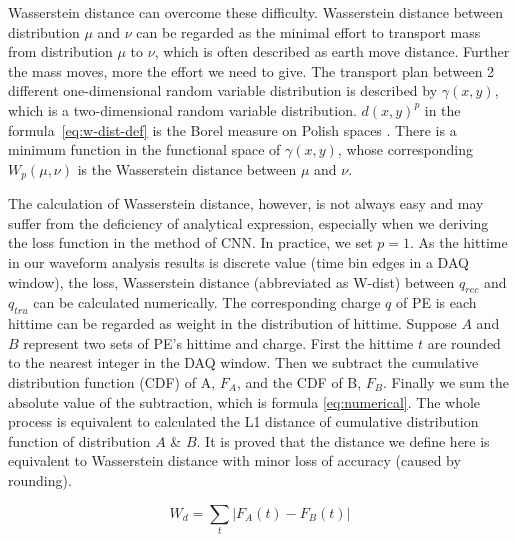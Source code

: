 Wasserstein distance can overcome these difficulty. Wasserstein distance between distribution $\mu$ and $\nu$ can be regarded as the minimal effort to transport mass from distribution $\mu$ to $\nu$, which is often described as earth move distance. Further the mass moves, more the effort we need to give. The transport plan between 2 different one-dimensional random variable distribution is described by $\gamma(x, y)$, which is a two-dimensional random variable distribution. $d(x,y)^{p}$ in the formula~\eqref{eq:w-dist-def} is the Borel measure on Polish spaces \cite{villani_2009}. There is a minimum function in the functional space of $\gamma(x, y)$, whose corresponding $W_{p}(\mu,\nu)$ is the Wasserstein distance between $\mu$ and $\nu$. 

The calculation of Wasserstein distance, however, is not always easy and may suffer from the deficiency of analytical expression, especially when we deriving the loss function in the method of CNN. In practice, we set $p=1$. As the hittime in our waveform analysis results is discrete value (time bin edges in a DAQ window), the loss, Wasserstein distance (abbreviated as W-dist) between $q_{rec}$ and $q_{tru}$ can be calculated numerically. The corresponding charge $q$ of PE is each hittime can be regarded as weight in the distribution of hittime. Suppose $A$ and $B$ represent two sets of PE's hittime and charge. First the hittime $t$ are rounded to the nearest integer in the DAQ window. Then we subtract the cumulative distribution function (CDF) of A, $F_{A}$, and the CDF of B, $F_{B}$. Finally we sum the absolute value of the subtraction, which is formula \eqref{eq:numerical}. The whole process is equivalent to calculated the L1 distance of cumulative distribution function of distribution $A$ \& $B$. It is proved that the distance we define here is equivalent to Wasserstein distance with minor loss of accuracy (caused by rounding). 

\begin{equation}
    W_{d} = \sum_t|F_{A}(t) - F_{B}(t)|
    \label{eq:numerical}
\end{equation}